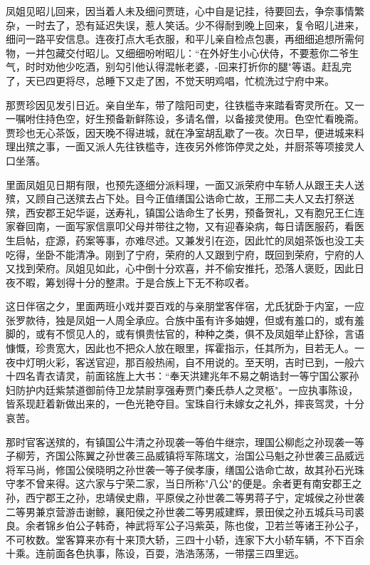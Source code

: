 凤姐见昭儿回来，因当着人未及细问贾琏，心中自是记挂，待要回去，争奈事情繁杂，一时去了，恐有延迟失误，惹人笑话。少不得耐到晚上回来，复令昭儿进来，细问一路平安信息。连夜打点大毛衣服，和平儿亲自检点包裹，再细细追想所需何物，一并包藏交付昭儿。又细细吩咐昭儿：“在外好生小心伏侍，不要惹你二爷生气，时时劝他少吃酒，别勾引他认得混帐老婆，-回来打折你的腿"等语。赶乱完了，天已四更将尽，总睡下又走了困，不觉天明鸡唱，忙梳洗过宁府中来。

那贾珍因见发引日近。亲自坐车，带了陰阳司吏，往铁槛寺来踏看寄灵所在。又一一嘱咐住持色空，好生预备新鲜陈设，多请名僧，以备接灵使用。色空忙看晚斋。贾珍也无心茶饭，因天晚不得进城，就在净室胡乱歇了一夜。次日早，便进城来料理出殡之事，一面又派人先往铁槛寺，连夜另外修饰停灵之处，并厨茶等项接灵人口坐落。

里面凤姐见日期有限，也预先逐细分派料理，一面又派荣府中车轿人从跟王夫人送殡，又顾自己送殡去占下处。目今正值缮国公诰命亡故，王邢二夫人又去打祭送殡，西安郡王妃华诞，送寿礼，镇国公诰命生了长男，预备贺礼，又有胞兄王仁连家眷回南，一面写家信禀叩父母并带往之物，又有迎春染病，每日请医服药，看医生启帖，症源，药案等事，亦难尽述。又兼发引在迩，因此忙的凤姐茶饭也没工夫吃得，坐卧不能清净。刚到了宁府，荣府的人又跟到宁府，既回到荣府，宁府的人又找到荣府。凤姐见如此，心中倒十分欢喜，并不偷安推托，恐落人褒贬，因此日夜不暇，筹划得十分的整肃。于是合族上下无不称叹者。

这日伴宿之夕，里面两班小戏并耍百戏的与亲朋堂客伴宿，尤氏犹卧于内室，一应张罗款待，独是凤姐一人周全承应。合族中虽有许多妯娌，但或有羞口的，或有羞脚的，或有不惯见人的，或有惧贵怯官的，种种之类，俱不及凤姐举止舒徐，言语慷慨，珍贵宽大，因此也不把众人放在眼里，挥霍指示，任其所为，目若无人。一夜中灯明火彩，客送官迎，那百般热闹，自不用说的。至天明，吉时已到，一般六十四名青衣请灵，前面铭旌上大书：“奉天洪建兆年不易之朝诰封一等宁国公冢孙妇防护内廷紫禁道御前侍卫龙禁尉享强寿贾门秦氏恭人之灵柩"。一应执事陈设，皆系现赶着新做出来的，一色光艳夺目。宝珠自行未嫁女之礼外，摔丧驾灵，十分哀苦。

那时官客送殡的，有镇国公牛清之孙现袭一等伯牛继宗，理国公柳彪之孙现袭一等子柳芳，齐国公陈翼之孙世袭三品威镇将军陈瑞文，治国公马魁之孙世袭三品威远将军马尚，修国公侯晓明之孙世袭一等子侯孝康，缮国公诰命亡故，故其孙石光珠守孝不曾来得。这六家与宁荣二家，当日所称"八公"的便是。余者更有南安郡王之孙，西宁郡王之孙，忠靖侯史鼎，平原侯之孙世袭二等男蒋子宁，定城侯之孙世袭二等男兼京营游击谢鲸，襄阳侯之孙世袭二等男戚建辉，景田侯之孙五城兵马司裘良。余者锦乡伯公子韩奇，神武将军公子冯紫英，陈也俊，卫若兰等诸王孙公子，不可枚数。堂客算来亦有十来顶大轿，三四十小轿，连家下大小轿车辆，不下百余十乘。连前面各色执事，陈设，百耍，浩浩荡荡，一带摆三四里远。


